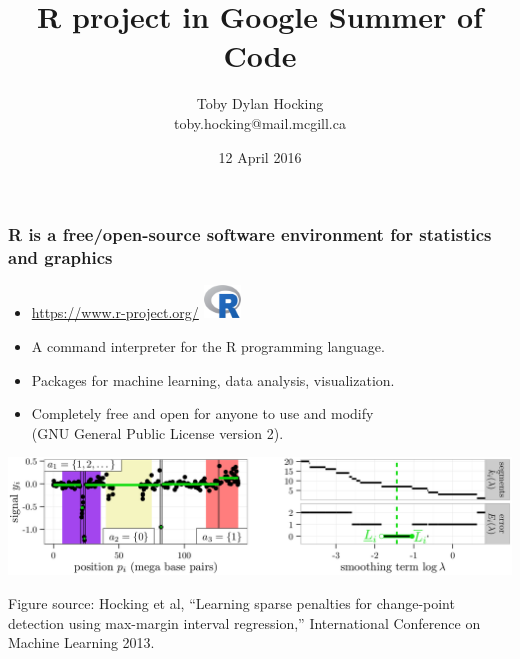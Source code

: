 \documentclass{beamer}
\begin{document}
\title{R project in Google Summer of Code}

\author{
  Toby Dylan Hocking\\
  toby.hocking@mail.mcgill.ca}

\date{12 April 2016}

\maketitle

\begin{frame}
  \frametitle{R is a free/open-source software environment for
    statistics and graphics}
  \begin{itemize}
  \item \url{https://www.r-project.org/} \includegraphics[width=1cm]{Rlogo}
  \item A command interpreter for the R programming language.
  \item Packages for machine learning, data analysis, visualization.
  \item Completely free and open for anyone to use and modify\\(GNU
    General Public License version 2).
  \end{itemize}
  \includegraphics[width=\textwidth]{HOCKING-ICML2013-Figure1}
  
  Figure source: Hocking et al, ``Learning sparse penalties for
  change-point detection using max-margin interval regression,''
  International Conference on Machine Learning 2013.
\end{frame}


\end{document}
